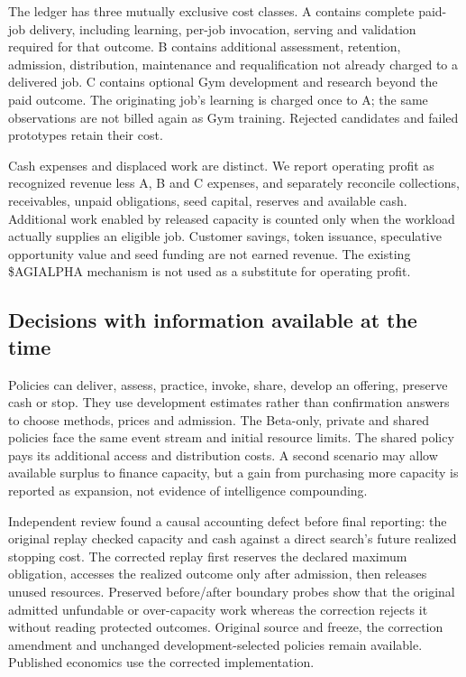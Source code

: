 \documentclass[11pt,letterpaper]{article}
\begin{document}
The ledger has three mutually exclusive cost classes. A contains complete paid-job delivery, including learning, per-job invocation, serving and validation required for that outcome. B contains additional assessment, retention, admission, distribution, maintenance and requalification not already charged to a delivered job. C contains optional Gym development and research beyond the paid outcome. The originating job's learning is charged once to A; the same observations are not billed again as Gym training. Rejected candidates and failed prototypes retain their cost.



Cash expenses and displaced work are distinct. We report operating profit as recognized revenue less A, B and C expenses, and separately reconcile collections, receivables, unpaid obligations, seed capital, reserves and available cash. Additional work enabled by released capacity is counted only when the workload actually supplies an eligible job. Customer savings, token issuance, speculative opportunity value and seed funding are not earned revenue. The existing \$AGIALPHA mechanism is not used as a substitute for operating profit.

\subsection{Decisions with information available at the time}

Policies can deliver, assess, practice, invoke, share, develop an offering, preserve cash or stop. They use development estimates rather than confirmation answers to choose methods, prices and admission. The Beta-only, private and shared policies face the same event stream and initial resource limits. The shared policy pays its additional access and distribution costs. A second scenario may allow available surplus to finance capacity, but a gain from purchasing more capacity is reported as expansion, not evidence of intelligence compounding.

Independent review found a causal accounting defect before final reporting: the original replay checked capacity and cash against a direct search's future realized stopping cost. The corrected replay first reserves the declared maximum obligation, accesses the realized outcome only after admission, then releases unused resources. Preserved before/after boundary probes show that the original admitted unfundable or over-capacity work whereas the correction rejects it without reading protected outcomes. Original source and freeze, the correction amendment and unchanged development-selected policies remain available. Published economics use the corrected implementation.
\end{document}

